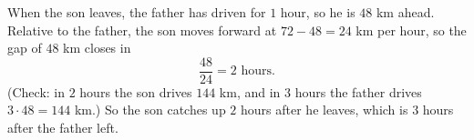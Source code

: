 When the son leaves, the father has driven for $1$ hour, so he is $48$ km ahead. Relative to the father, the son moves forward at $72-48=24$ km per hour, so the gap of $48$ km closes in
\[\dfrac{48}{24}=\boxed{2\text{ hours}}.\]
(Check: in $2$ hours the son drives $144$ km, and in $3$ hours the father drives $3\cdot48=144$ km.) So the son catches up $2$ hours after he leaves, which is $3$ hours after the father left.
